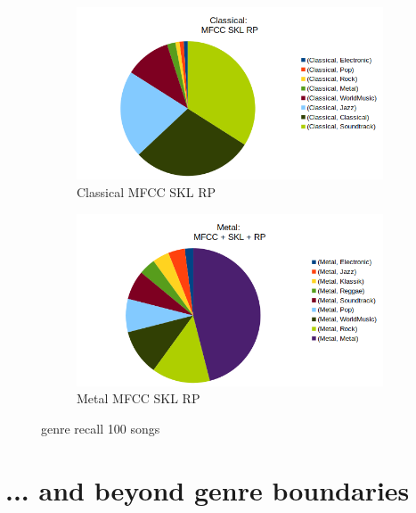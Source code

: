 \begin{figure}[htbp]
{{			\begin{subfigure}{.495\textwidth}
				\centering    
				\includegraphics[scale=0.3]{Images/SparkFeat/Classical_MFCC_SKL_RP.png}
				\caption{Classical MFCC SKL RP}
				\label{cmsr}
			\end{subfigure}
			\begin{subfigure}{.495\textwidth}
				\centering     
				\includegraphics[scale=0.3]{Images/SparkFeat/Metal_MFCC_SKL_RP.png}
				\caption{Metal MFCC SKL RP}
				\label{mfsr}
			\end{subfigure}%
	}}
	\caption{genre recall 100 songs}
	\label{fig:genrerec}
\end{figure}


\section{... and beyond genre boundaries}


